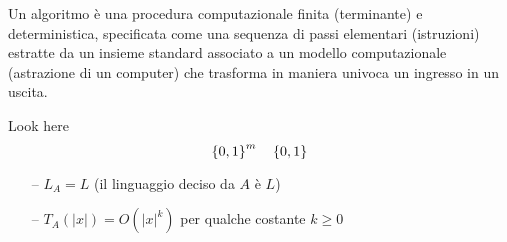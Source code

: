 \begin{definition}[Algoritmo]\label{def:algex}
    Un algoritmo è una procedura computazionale finita (terminante) e deterministica, specificata come una sequenza di passi elementari (istruzioni) estratte da un insieme standard associato a un modello computazionale (astrazione di un computer) che trasforma in maniera univoca un ingresso in un uscita.
\end{definition}

Look here 
\begin{equation*}
    \left\{0,1\right\}^{m}
    \quad
    \left\{0,1\right\}^{}
\end{equation*}

\begin{itemize}[noitemsep,parsep=0pt,partopsep=0pt,topsep=0pt]
    \item[--] $L_A = L$ (il linguaggio deciso da $A$ è $L$)
    \item[--] $T_A(|x|) = O(|x|^k)$ per qualche costante $k \geq 0$
\end{itemize}
